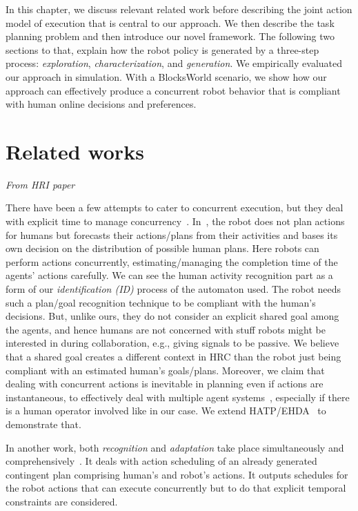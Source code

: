 In this chapter, we discuss relevant related work before describing the joint action model of execution that is central to our approach. 
We then describe the task planning problem and then introduce our novel framework. 
The following two sections to that, explain how the robot policy is generated by a three-step process: \textit{exploration}, \textit{characterization}, and \textit{generation}. 
We empirically evaluated our approach in simulation. With a BlocksWorld scenario, we show how our approach can effectively produce a concurrent robot behavior that is compliant with human online decisions and preferences.  


\section{Related works}

\textit{From HRI paper}

There have been a few attempts to cater to concurrent execution, but they deal with explicit time to manage concurrency~\cite{CirilloKS09a,kockemann2014grandpa}. 
In~\cite{CirilloKS09}, the robot does not plan actions for humans but forecasts their actions/plans from their activities and bases its own decision on the distribution of possible human plans. Here robots can perform actions concurrently, estimating/managing the completion time of the agents' actions carefully. 
We can see the human activity recognition part as a form of our \textit{identification (ID)} process of the automaton used. The robot needs such a plan/goal recognition technique to be compliant with the human's decisions. 
But, unlike ours, they do not consider an explicit shared goal among the agents, and hence humans are not concerned with stuff robots might be interested in during collaboration, e.g., giving signals to be passive. 
We believe that a shared goal creates a different context in HRC than the robot just being compliant with an estimated human's goals/plans. 
Moreover, we claim that dealing with concurrent actions is inevitable in planning even if actions are instantaneous, to effectively deal with multiple agent systems~\cite{CrosbyJR14,ShekharB20}, especially if there is a human operator involved like in our case. 
We extend HATP/EHDA~\cite{buisan:hal-03684211} to demonstrate that.

In another work, both \textit{recognition} and \textit{adaptation} take place simultaneously and comprehensively~\cite{levine2014concurrent}. 
It deals with action scheduling of an already generated contingent plan comprising human's and robot's actions. 
It outputs schedules for the robot actions that can execute concurrently but to do that explicit temporal constraints are considered. 

